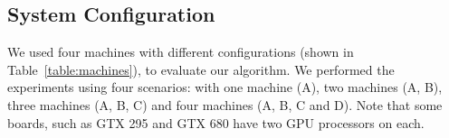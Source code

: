 \documentclass[journal]{IEEEtran}
\begin{document}
\subsection{System Configuration}

We used four machines with different configurations (shown in
Table~\ref{table:machines}), to evaluate our algorithm. We performed the
experiments using four scenarios: with one machine (A), two machines (A, B),
three machines (A, B, C) and four machines (A, B, C and D). Note that some
boards, such as GTX 295 and GTX 680 have two GPU processors on each.

 
\end{document}
